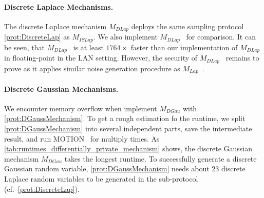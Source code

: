 \paragraph{Discrete Laplace Mechanisms.}
The discrete Laplace mechanism $M_{DLap}$ deploys the same sampling protocol \autoref{prot:DiscreteLap} as $M_{ISLap}$.
We also implement $M_{DLap}$~\cite{eigner2014differentially} for comparison.
It can be seen, that $M_{DLap}$~\cite{eigner2014differentially} is at least $1764\times$ faster than our implementation of $M_{DLap}$ in \booleanGMW floating-point in the LAN setting. However, the security of $M_{DLap}$~\cite{eigner2014differentially} remains to prove as it applies similar noise generation procedure as $M_{Lap}$~\cite{eigner2014differentially}.

\paragraph{Discrete Gaussian Mechanisms.}
We encounter memory overflow when implement \booleanGMW $M_{DGau}$ with \autoref{prot:DGaussMechanism}. To get a rough estimation fo the runtime, we split \autoref{prot:DGaussMechanism} into several independent parts, save the intermediate result, and run MOTION~\cite{braun2022motion} for multiply times.
As \autoref{tab:runtimes_differentially_private_mechanism} shows, the discrete Gaussian mechanism $M_{DGau}$ takes the longest runtime. To successfully generate a discrete Gaussian random variable, \autoref{prot:DGaussMechanism} needs about $23$ discrete Laplace random variables to be generated in the sub-protocol (cf.~\autoref{prot:DiscreteLap}).


